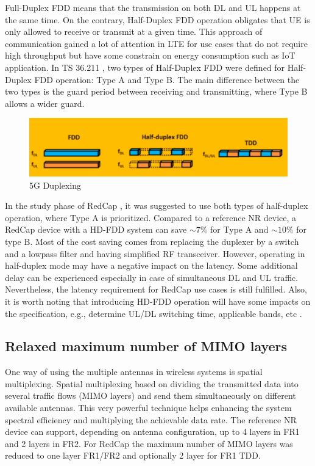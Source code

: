\documentclass[conference]{IEEEtran}
\begin{document}
 Full-Duplex FDD means that the transmission on both DL and UL happens at the same time. On the contrary, Half-Duplex FDD operation obligates that UE is only allowed to receive or transmit at a given time.  This approach of communication gained a lot of attention in LTE for use cases that do not require high throughput but have some constrain on energy consumption such as IoT application. In TS 36.211 \cite{3gpp_nr_2022-2_38.211}, two types of Half-Duplex FDD were defined for Half-Duplex FDD operation: Type A and Type B. The main difference between the two types is the guard period between receiving and transmitting, where Type B allows a wider guard.
\begin{figure}
    \centering
    \includegraphics[width=\linewidth]{Pictures/5G Duplexing.png}
    \caption{5G Duplexing}
    \label{fig:5g-duplexing}
\end{figure}

In the study phase of RedCap \cite{3gpp_study_2021_38.875}, it was suggested to use both types of half-duplex operation, where Type A is prioritized.
Compared to a reference NR device, a RedCap device with a HD-FDD system can save $\sim7\%$ for Type A and $\sim10\%$ for type B. Most of the cost saving comes from replacing the duplexer by a switch and a lowpass filter and having simplified RF transceiver.
However, operating in half-duplex mode may have a negative impact on the latency. Some additional delay can be experienced especially in case of simultaneous DL and UL traffic. Nevertheless, the latency requirement for RedCap use cases is still fulfilled. Also, it is worth noting that introducing HD-FDD operation will have some impacts on the specification, e.g., determine UL/DL switching time, applicable bands, etc \cite{ratasuk_reduced_2021}. 


\subsection{Relaxed maximum number of MIMO layers}
\label{sec:4-4}

One way of using the multiple antennas in wireless systems is spatial multiplexing. Spatial multiplexing based on dividing the transmitted data into several traffic flows (MIMO layers) and send them simultaneously on different available antennas. This very powerful technique helps enhancing the system spectral efficiency and multiplying the achievable data rate.
The reference NR device can support, depending on antenna configuration, up to 4 layers in FR1 and 2 layers in FR2.
For RedCap the maximum number of MIMO layers was reduced to one layer FR1/FR2 and optionally 2 layer for FR1 TDD.
\end{document}
